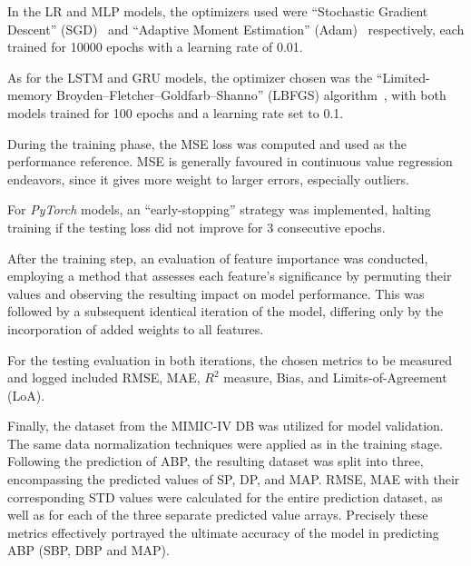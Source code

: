 In the LR and MLP models, the optimizers used were \enquote{Stochastic Gradient Descent} (SGD)~\cite{SGDPyTorchDocumentation} and \enquote{Adaptive Moment Estimation} (Adam)~\cite{AdamPyTorchDocumentationa} respectively,
each trained for 10000 epochs with a learning rate of 0.01.

As for the LSTM and GRU models, the optimizer chosen was the \enquote{Limited-memory Broyden–Fletcher–Goldfarb–Shanno} (LBFGS) algorithm~\cite{LBFGSPyTorchDocumentation},
with both models trained for 100 epochs and a learning rate set to 0.1.

During the training phase, the \ac{MSE} loss was computed and used as the performance reference.
MSE is generally favoured in continuous value regression endeavors, since it gives more weight to larger errors, especially outliers.

For \textit{PyTorch} models, an \enquote{early-stopping} strategy was implemented, halting training if the testing loss did not improve for 3 consecutive epochs.

After the training step, an evaluation of feature importance was conducted, employing a method that assesses each feature's significance by permuting their values and observing the resulting impact on model performance.
This was followed by a subsequent identical iteration of the model, differing only by the incorporation of added weights to all features.

For the testing evaluation in both iterations, the chosen metrics to be measured and logged included \ac{RMSE}, \ac{MAE}, \textit{$R^2$} measure, Bias, and Limits-of-Agreement (LoA).

Finally, the dataset from the MIMIC-IV DB was utilized for model validation.
The same data normalization techniques were applied as in the training stage.
Following the prediction of ABP, the resulting dataset was split into three, encompassing the predicted values of SP, DP, and MAP\@.
RMSE, MAE with their corresponding \ac{STD} values were calculated for the entire prediction dataset, as well as for each of the three separate predicted value arrays.
Precisely these metrics effectively portrayed the ultimate accuracy of the model in predicting ABP (SBP, DBP and MAP).

\vspace{-0.6cm}